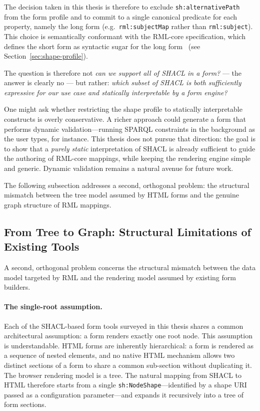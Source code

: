 The decision taken in this thesis is therefore to exclude \texttt{sh:alternativePath} from the form profile and to commit to a single
canonical predicate for each property, namely the long form (e.g.\ \texttt{rml:subjectMap} rather than \texttt{rml:subject}). This choice is semantically conformant with the RML-core specification, which defines the short form as syntactic sugar for the long form~\cite{rml-core} (see Section~\ref{sec:shape-profile}).

The question is therefore not \emph{can we support all of SHACL in a form?} --- the answer is clearly no --- but rather: \emph{which subset of SHACL is both sufficiently expressive for our use case and statically interpretable by a form engine?}

One might ask whether restricting the shape profile to statically interpretable constructs is overly conservative.
A richer approach could generate a form that performs dynamic validation---running SPARQL constraints in the background as the user types, for instance.
This thesis does not pursue that direction: the goal is to show that a \emph{purely static} interpretation of SHACL is already sufficient
to guide the authoring of RML-core mappings, while keeping the rendering engine simple and generic.
Dynamic validation remains a natural avenue for future work.

The following subsection addresses a second, orthogonal problem:
the structural mismatch between the tree model assumed by HTML forms
and the genuine graph structure of RML mappings.

\subsection{From Tree to Graph: Structural Limitations of Existing Tools}
\label{sec:tree-to-graph}

A second, orthogonal problem concerns the structural mismatch between
the data model targeted by RML and the rendering model assumed by
existing form builders.

\paragraph{The single-root assumption.}
Each of the SHACL-based form tools surveyed in this thesis shares a common architectural assumption: a form renders exactly one root node.
This assumption is understandable.
HTML forms are inherently hierarchical: a form is rendered as a sequence of nested elements, and no native HTML mechanism allows two distinct sections of a form to share a common sub-section without duplicating it.
The browser rendering model is a tree.
The natural mapping from SHACL to HTML therefore starts from a single \texttt{sh:NodeShape}---identified by a shape URI passed as a configuration parameter---and expands it recursively into a tree of form sections.

